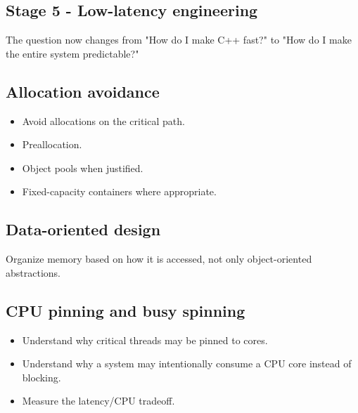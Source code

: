 \documentclass[11pt,letterpaper]{article}
\begin{document}
\par{}
\begin{samepage}
\section{Stage 5 - Low-latency engineering}\label{sec:9}

\label{stage:5}

The question now changes from "How do I make C++ fast?" to "How do I make the entire system predictable?"

\subsection*{Allocation avoidance}

\begin{itemize}

\item Avoid allocations on the critical path.

\item Preallocation.

\item Object pools when justified.

\item Fixed-capacity containers where appropriate.

\end{itemize}

\end{samepage}

\subsection*{Data-oriented design}

Organize memory based on how it is accessed, not only object-oriented abstractions.

\subsection*{CPU pinning and busy spinning}

\begin{itemize}

\item Understand why critical threads may be pinned to cores.

\item Understand why a system may intentionally consume a CPU core instead of blocking.

\item Measure the latency/CPU tradeoff.

\end{itemize}
\end{document}
